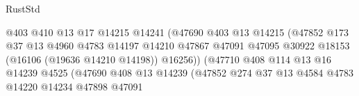 \begin{lexlean}{RustStd}
\begin{coremodule}
                                                @403
                                                @410
                                                @13
                                                @17
                                                @14215
                                                @14241
                                                (@47690
                                                  @403
                                                  @13
                                                  @14215
                                                  (@47852
                                                    @173
                                                    @37
                                                    @13
                                                    @4960
                                                    @4783
                                                    @14197
                                                    @14210
                                                    @47867
                                                    @47091
                                                    @47095
                                                    @30922
                                                    @18153
                                                    (@16106 (@19636 @14210 @14198))
                                                    @16256))
                                                (@47710
                                                  @408
                                                  @114
                                                  @13
                                                  @16
                                                  @14239
                                                  @4525
                                                  (@47690
                                                    @408
                                                    @13
                                                    @14239
                                                    (@47852
                                                      @274
                                                      @37
                                                      @13
                                                      @4584
                                                      @4783
                                                      @14220
                                                      @14234
                                                      @47898
                                                      @47091

\end{coremodule}
\end{lexlean}
